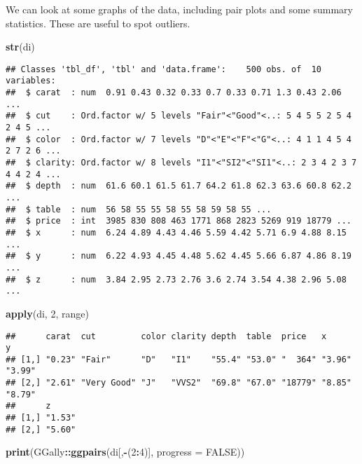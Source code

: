 \documentclass[]{book}
\newenvironment{Shaded}{\begin{snugshade}}{\end{snugshade}}
\newcommand{\DataTypeTok}[1]{\textcolor[rgb]{0.13,0.29,0.53}{#1}}
\newcommand{\DecValTok}[1]{\textcolor[rgb]{0.00,0.00,0.81}{#1}}
\newcommand{\KeywordTok}[1]{\textcolor[rgb]{0.13,0.29,0.53}{\textbf{#1}}}
\newcommand{\NormalTok}[1]{#1}
\newcommand{\OperatorTok}[1]{\textcolor[rgb]{0.81,0.36,0.00}{\textbf{#1}}}
\newcommand{\OtherTok}[1]{\textcolor[rgb]{0.56,0.35,0.01}{#1}}
\theoremstyle{definition}
\theoremstyle{definition}
\theoremstyle{definition}
\theoremstyle{remark}
\begin{document}
We can look at some graphs of the data, including pair plots and some summary statistics. These are useful to spot outliers.

\begin{Shaded}
\begin{Highlighting}[]
\KeywordTok{str}\NormalTok{(di)}
\end{Highlighting}
\end{Shaded}

\begin{verbatim}
## Classes 'tbl_df', 'tbl' and 'data.frame':    500 obs. of  10 variables:
##  $ carat  : num  0.91 0.43 0.32 0.33 0.7 0.33 0.71 1.3 0.43 2.06 ...
##  $ cut    : Ord.factor w/ 5 levels "Fair"<"Good"<..: 5 4 5 5 2 5 4 2 4 5 ...
##  $ color  : Ord.factor w/ 7 levels "D"<"E"<"F"<"G"<..: 4 1 1 4 5 4 2 7 2 6 ...
##  $ clarity: Ord.factor w/ 8 levels "I1"<"SI2"<"SI1"<..: 2 3 4 2 3 7 4 4 2 4 ...
##  $ depth  : num  61.6 60.1 61.5 61.7 64.2 61.8 62.3 63.6 60.8 62.2 ...
##  $ table  : num  56 58 55 55 58 55 58 59 58 55 ...
##  $ price  : int  3985 830 808 463 1771 868 2823 5269 919 18779 ...
##  $ x      : num  6.24 4.89 4.43 4.46 5.59 4.42 5.71 6.9 4.88 8.15 ...
##  $ y      : num  6.22 4.93 4.45 4.48 5.62 4.45 5.66 6.87 4.86 8.19 ...
##  $ z      : num  3.84 2.95 2.73 2.76 3.6 2.74 3.54 4.38 2.96 5.08 ...
\end{verbatim}

\begin{Shaded}
\begin{Highlighting}[]
\KeywordTok{apply}\NormalTok{(di, }\DecValTok{2}\NormalTok{, range)}
\end{Highlighting}
\end{Shaded}

\begin{verbatim}
##      carat  cut         color clarity depth  table  price   x      y     
## [1,] "0.23" "Fair"      "D"   "I1"    "55.4" "53.0" "  364" "3.96" "3.99"
## [2,] "2.61" "Very Good" "J"   "VVS2"  "69.8" "67.0" "18779" "8.85" "8.79"
##      z     
## [1,] "1.53"
## [2,] "5.60"
\end{verbatim}

\begin{Shaded}
\begin{Highlighting}[]
\KeywordTok{print}\NormalTok{(GGally}\OperatorTok{::}\KeywordTok{ggpairs}\NormalTok{(di[,}\OperatorTok{-}\NormalTok{(}\DecValTok{2}\OperatorTok{:}\DecValTok{4}\NormalTok{)], }\DataTypeTok{progress =} \OtherTok{FALSE}\NormalTok{))}
\end{Highlighting}
\end{Shaded}
\end{document}

